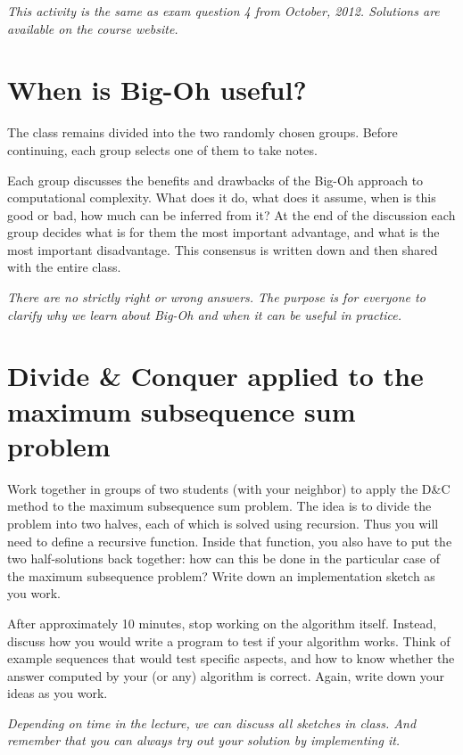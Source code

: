 \documentclass[a4paper]{article}
\begin{document}
\emph{
  This activity is the same as exam question 4 from October, 2012.
  Solutions are available on the course website.
}



\section{When is Big-Oh useful?}

The class remains divided into the two randomly chosen groups.
Before continuing, each group selects one of them to take notes.

Each group discusses the benefits and drawbacks of the Big-Oh approach to computational complexity.
What does it do, what does it assume, when is this good or bad, how much can be inferred from it?
At the end of the discussion each group decides what is for them the most important advantage, and what is the most important disadvantage.
This consensus is written down and then shared with the entire class.

\emph{
  There are no strictly right or wrong answers.
  The purpose is for everyone to clarify why we learn about Big-Oh and when it can be useful in practice.
}



\section{Divide \& Conquer applied to the maximum subsequence sum problem}

Work together in groups of two students (with your neighbor) to apply the D\&C method to the maximum subsequence sum problem.
The idea is to divide the problem into two halves, each of which is solved using recursion.
Thus you will need to define a recursive function.
Inside that function, you also have to put the two half-solutions back together:
how can this be done in the particular case of the maximum subsequence problem?
Write down an implementation sketch as you work.

After approximately 10 minutes, stop working on the algorithm itself.
Instead, discuss how you would write a program to test if your algorithm works.
Think of example sequences that would test specific aspects, and how to know whether the answer computed by your (or any) algorithm is correct.
Again, write down your ideas as you work.


\emph{
  Depending on time in the lecture, we can discuss all sketches in class.
  And remember that you can always try out your solution by implementing it.
}
\end{document}
